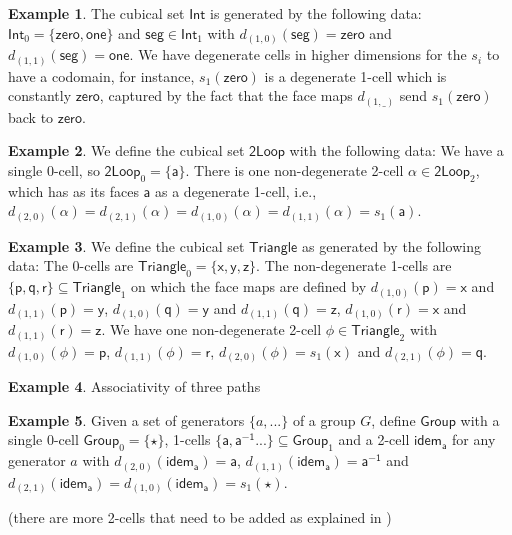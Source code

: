\documentclass[11pt]{article}
\theoremstyle{definition}
\newtheorem{example}{Example}
\newcommand{\smap}[1]{s_{{#1}}}
\newcommand{\dmap}[2]{d_{({#1} , {#2})}}
\newcommand{\cset}[1]{\mathsf{{#1}}}
\begin{document}
\begin{example}\label{exp:int}
  The cubical set $\cset{Int}$ is generated by the following data: $\cset{Int}_0
  = \{ \cset{zero} , \cset{one} \}$ and $\cset{seg} \in \cset{Int}_1$ with
  $\dmap{1}{0}(\cset{seg}) = \cset{zero}$ and $\dmap{1}{1}(\cset{seg}) =
  \cset{one}$. We have degenerate cells in higher dimensions for the $\smap{i}$
  to have a codomain, for instance, $\smap{1}(\cset{zero})$ is a degenerate
  1-cell which is constantly $\cset{zero}$, captured by the fact that the face
  maps $\dmap{1}{\_}$ send
  $\smap{1}(\cset{zero})$ back to $\cset{zero}$.
\end{example}

\begin{example}\label{exp:loopspace}
  We define the cubical set $\cset{2Loop}$ with the following data: We have a
  single 0-cell, so $\cset{2Loop}_0 = \{
  \cset{a} \}$. There is one non-degenerate 2-cell $\cset{\alpha} \in
  \cset{2Loop}_2$, which has as its faces $\cset{a}$ as a degenerate 1-cell, i.e.,
  $\dmap{2}{0}(\cset{\alpha}) = \dmap{2}{1}(\cset{\alpha}) =
  \dmap{1}{0}(\cset{\alpha}) = \dmap{1}{1}(\cset{\alpha}) = \smap{1} (\cset{a})$.
\end{example}

\begin{example}\label{exp:triangle}
  We define the cubical set $\cset{Triangle}$ as generated by the following
  data: The 0-cells are $\cset{Triangle}_0 = \{ \cset{x} , \cset{y} , \cset{z}
  \}$. The non-degenerate 1-cells are $\{ \cset{p} ,
  \cset{q} , \cset{r} \} \subseteq \cset{Triangle}_1$ on which the face maps are defined by
    $\dmap{1}{0}(\cset{p}) = \cset{x}$ and $\dmap{1}{1}(\cset{p}) = \cset{y}$,
    $\dmap{1}{0}(\cset{q}) = \cset{y}$ and $\dmap{1}{1}(\cset{q}) = \cset{z}$,
    $\dmap{1}{0}(\cset{r}) = \cset{x}$ and $\dmap{1}{1}(\cset{r}) = \cset{z}$.
    We have one non-degenerate 2-cell $\cset{\phi} \in \cset{Triangle}_2$ with $\dmap{1}{0}(\cset{\phi}) =
    \cset{p}$, $\dmap{1}{1}(\cset{\phi}) = \cset{r}$, $\dmap{2}{0}(\cset{\phi})
    = \smap{1}(\cset{x})$ and $\dmap{2}{1}(\cset{\phi}) = \cset{q}$.
\end{example}

\begin{example}{\label{exp:assoc}}
  Associativity of three paths
\end{example}

\begin{example}\label{exp:group}
  Given a set of generators $\{a, ...\}$ of a group $G$, define $\cset{Group}$
  with a single 0-cell $\cset{Group}_0 = \{ \cset{\star} \}$, 
  1-cells $\{\cset{a} , \cset{a^{-1}} ... \} \subseteq \cset{Group}_1$ and a
  2-cell $\cset{idem_a}$ for any generator $a$ with 
  $\dmap{2}{0}(\cset{idem_a}) = \cset{a}$, $\dmap{1}{1}(\cset{idem_a}) =
  \cset{a^{-1}}$ and $\dmap{2}{1}(\cset{idem_a}) = \dmap{1}{0}(\cset{idem_a}) = \smap{1} (\cset{\star})$.

  (there are more 2-cells that need to be added as explained in \cite[Sect. 6.3]{bezem14_model_type_theor_cubic_sets})
\end{example}
\end{document}
